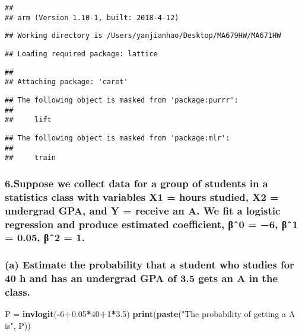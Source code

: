 \documentclass[]{article}
\newenvironment{Shaded}{\begin{snugshade}}{\end{snugshade}}
\newcommand{\KeywordTok}[1]{\textcolor[rgb]{0.13,0.29,0.53}{\textbf{#1}}}
\newcommand{\DecValTok}[1]{\textcolor[rgb]{0.00,0.00,0.81}{#1}}
\newcommand{\FloatTok}[1]{\textcolor[rgb]{0.00,0.00,0.81}{#1}}
\newcommand{\StringTok}[1]{\textcolor[rgb]{0.31,0.60,0.02}{#1}}
\newcommand{\OperatorTok}[1]{\textcolor[rgb]{0.81,0.36,0.00}{\textbf{#1}}}
\newcommand{\NormalTok}[1]{#1}
\begin{document}
\begin{verbatim}
## 
## arm (Version 1.10-1, built: 2018-4-12)
\end{verbatim}

\begin{verbatim}
## Working directory is /Users/yanjianhao/Desktop/MA679HW/MA671HW
\end{verbatim}

\begin{verbatim}
## Loading required package: lattice
\end{verbatim}

\begin{verbatim}
## 
## Attaching package: 'caret'
\end{verbatim}

\begin{verbatim}
## The following object is masked from 'package:purrr':
## 
##     lift
\end{verbatim}

\begin{verbatim}
## The following object is masked from 'package:mlr':
## 
##     train
\end{verbatim}

\subsubsection{6.Suppose we collect data for a group of students in a
statistics class with variables X1 = hours studied, X2 = undergrad GPA,
and Y = receive an A. We fit a logistic regression and produce estimated
coefficient, βˆ0 = −6, βˆ1 = 0.05, βˆ2 =
1.}\label{suppose-we-collect-data-for-a-group-of-students-in-a-statistics-class-with-variables-x1-hours-studied-x2-undergrad-gpa-and-y-receive-an-a.-we-fit-a-logistic-regression-and-produce-estimated-coefficient-0-6-1-0.05-2-1.}

\subsubsection{(a) Estimate the probability that a student who studies
for 40 h and has an undergrad GPA of 3.5 gets an A in the
class.}\label{a-estimate-the-probability-that-a-student-who-studies-for-40-h-and-has-an-undergrad-gpa-of-3.5-gets-an-a-in-the-class.}

\begin{Shaded}
\begin{Highlighting}[]
\NormalTok{P =}\StringTok{ }\KeywordTok{invlogit}\NormalTok{(}\OperatorTok{-}\DecValTok{6}\OperatorTok{+}\FloatTok{0.05}\OperatorTok{*}\DecValTok{40}\OperatorTok{+}\DecValTok{1}\OperatorTok{*}\FloatTok{3.5}\NormalTok{)}
\KeywordTok{print}\NormalTok{(}\KeywordTok{paste}\NormalTok{(}\StringTok{"The probability of getting a A is"}\NormalTok{, P))}
\end{Highlighting}
\end{Shaded}
\end{document}
